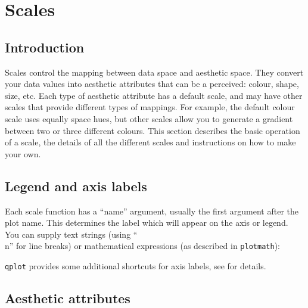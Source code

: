 


\chapter{Scales}

\section{Introduction}\label{sec:introduction}

Scales control the mapping between data space and aesthetic space.  They convert your data values into aesthetic attributes that can be a perceived: colour, shape, size, etc.  Each type of aesthetic attribute has a default scale, and may have other scales that provide different types of mappings.  For example, the default colour scale uses equally space hues, but other scales allow you to generate a gradient between two or three different colours.  This section describes the basic operation of a scale, the details of all the different scales and instructions on how to make your own.

\section{Legend and axis labels}\label{sec:legend_and_axis_labels}

Each scale function has a ``name'' argument, usually the first argument after the plot name.  This determines the label which will appear on the axis or legend. You can supply text strings (using ``\\n'' for line breaks) or mathematical expressions (as described in \verb|plotmath|):


\verb|qplot| provides some additional shortcuts for axis labels, see  for details.

\section{Aesthetic attributes}\label{sec:aesthetic_attributes}

